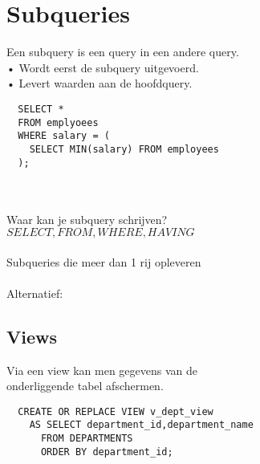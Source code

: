 \section{Subqueries}
Een subquery is een query in een andere query.
\\
• Wordt eerst de subquery uitgevoerd.\\
• Levert waarden aan de hoofdquery.\\

\begin{tiny}
\begin{lstlisting}
  SELECT *
  FROM emplyoees
  WHERE salary = (
    SELECT MIN(salary) FROM employees
  );
\end{lstlisting}
\end{tiny}
\\\\
Waar kan je subquery schrijven?\\
$SELECT, FROM, WHERE, HAVING$
\\\\
Subqueries die meer dan 1 rij opleveren\\
\\
Alternatief:

\subsection{Views}
Via een view kan men gegevens van de\\
onderliggende tabel afschermen.

\begin{tiny}
\begin{lstlisting}
  CREATE OR REPLACE VIEW v_dept_view
    AS SELECT department_id,department_name
      FROM DEPARTMENTS
      ORDER BY department_id;
\end{lstlisting}
\end{tiny}